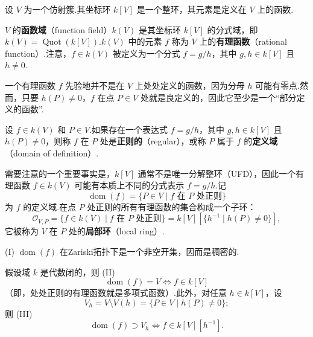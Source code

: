 设 \(V\) 为一个仿射簇.其坐标环 \(k[V]\) 是一个整环，其元素是定义在 \(V\) 上的函数.

\begin{definition}
\(V\) 的\textbf{函数域}（function field）\(k(V)\) 是其坐标环 \(k[V]\) 的分式域，即 \(k(V) = \operatorname{Quot}(k[V])\).\(k(V)\) 中的元素 \(f\) 称为 \(V\) 上的\textbf{有理函数}（rational function）.注意，\(f \in  k(V)\) 被定义为一个分式 \(f = g/h\)，其中 \(g,h \in  k[V]\) 且 \(h \neq  0\).
\end{definition}

一个有理函数 \(f\) 先验地并不是在 \(V\) 上处处定义的函数，因为分母 \(h\) 可能有零点.然而，只要 \(h(P) \neq  0\)，\(f\) 在点 \(P \in  V\) 处就是良定义的，因此它至少是一个“部分定义的函数”.

\begin{definition}
设 \(f \in  k(V)\) 和 \(P \in  V\).如果存在一个表达式 \(f = g/h\)，其中 \(g,h \in  k[V]\) 且 \(h(P) \neq  0\)，则称 \(f\) 在 \(P\) 处是\textbf{正则的}（regular），或称 \(P\) 属于 \(f\) 的\textbf{定义域}（domain of definition）.
\end{definition}

需要注意的一个重要事实是，\(k[V]\) 通常不是唯一分解整环（UFD），因此一个有理函数 \(f \in  k(V)\) 可能有本质上不同的分式表示 \(f = g/h\).记
\[
\operatorname{dom}(f) = \{ P \in  V \mid  f \text{ 在 } P \text{ 处正则} \}
\]
为 \(f\) 的定义域.在点 \(P\) 处正则的所有有理函数的集合构成一个子环：
\[
{\mathcal{O}}_{V,P} = \{ f \in  k(V) \mid  f \text{ 在 } P \text{ 处正则} \} = k[V][\{ h^{-1} \mid  h(P) \neq  0 \}],
\]
它被称为 \(V\) 在 \(P\) 处的\textbf{局部环}（local ring）.

\begin{theorem}
(I) \(\operatorname{dom}(f)\) 在Zariski拓扑下是一个非空开集，因而是稠密的.

假设域 \(k\) 是代数闭的，则
(II)
\[
\operatorname{dom}(f) = V \Leftrightarrow  f \in  k[V]
\]
（即，处处正则的有理函数就是多项式函数）.此外，对任意 \(h \in  k[V]\)，设
\[
{V}_{h} = V \setminus  V(h) = \{ P \in  V \mid  h(P) \neq  0 \};
\]
则
(III)
\[
\operatorname{dom}(f) \supset  {V}_{h} \Leftrightarrow  f \in  k[V][h^{-1}].
\]
\end{theorem}

